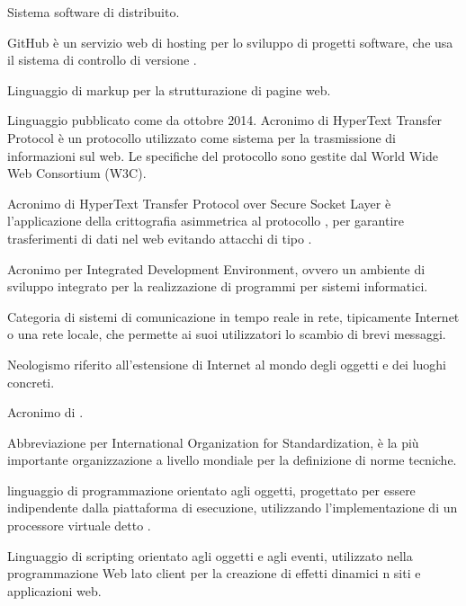 Sistema software di  distribuito.

GitHub è un servizio web di hosting per lo sviluppo di progetti software, che usa il sistema di controllo di versione .
\clearpage

Linguaggio di markup per la strutturazione di pagine web.

Linguaggio  pubblicato come  da ottobre 2014.
Acronimo di HyperText Transfer Protocol \`e un protocollo utilizzato come sistema per la trasmissione di informazioni sul web. Le specifiche del protocollo sono gestite dal World Wide Web Consortium (W3C).

Acronimo di  HyperText Transfer Protocol over Secure Socket Layer \`e l'applicazione della crittografia asimmetrica al protocollo , per garantire trasferimenti di dati nel web evitando attacchi di tipo .
\clearpage

Acronimo per Integrated Development Environment, ovvero un ambiente di sviluppo integrato per la realizzazione di programmi per sistemi informatici.

Categoria di sistemi di comunicazione in tempo reale in rete, tipicamente Internet o una rete locale, che permette ai suoi utilizzatori lo scambio di brevi messaggi.

Neologismo riferito all'estensione di Internet al mondo degli oggetti e dei luoghi concreti.

Acronimo di .

Abbreviazione per International Organization for Standardization, è la più importante organizzazione a livello mondiale per la definizione di norme tecniche.
\clearpage

linguaggio di programmazione orientato agli oggetti, progettato per essere indipendente dalla piattaforma di esecuzione, utilizzando l'implementazione di un processore virtuale detto .

Linguaggio di scripting orientato agli oggetti e agli eventi, utilizzato nella programmazione Web lato client per la creazione di effetti dinamici n siti e applicazioni web.

